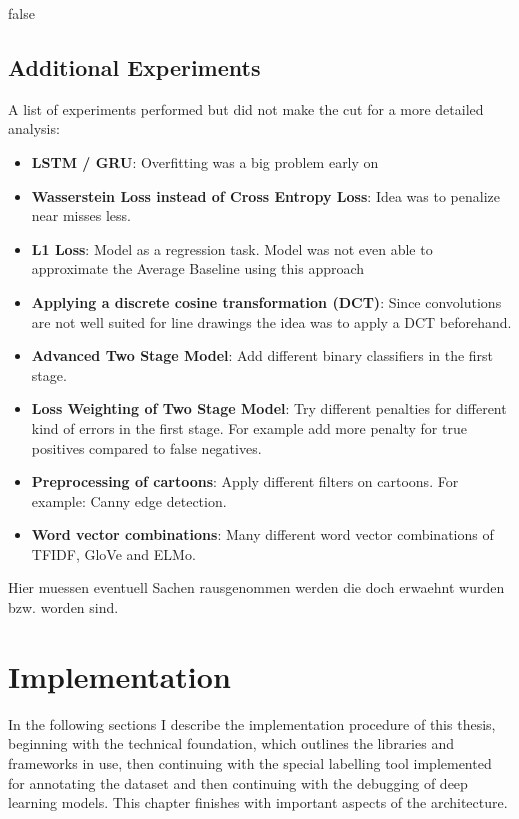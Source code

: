 \documentclass[draft,final,oneside]{vutinfth} %
\begin{document}
\fi

\if false
\section{Additional Experiments}
A list of experiments performed but did not make the cut for a more detailed analysis:

\begin{itemize}
\item \textbf{LSTM / GRU}: Overfitting was a big problem early on
\item \textbf{Wasserstein Loss instead of Cross Entropy Loss}: Idea was to penalize near misses less.
\item \textbf{L1 Loss}: Model as a regression task. Model was not even able to approximate the Average Baseline using this approach
\item \textbf{Applying a discrete cosine transformation (DCT)}: Since convolutions are not well suited for line drawings the idea was to apply a DCT beforehand. 
\item \textbf{Advanced Two Stage Model}: Add different binary classifiers in the first stage.
\item \textbf{Loss Weighting of Two Stage Model}: Try different penalties for different kind of errors in the first stage. For example add more penalty for true positives compared to false negatives.
\item \textbf{Preprocessing of cartoons}: Apply different filters on cartoons. For example: Canny edge detection.
\item \textbf{Word vector combinations}: Many different word vector combinations of TFIDF, GloVe and ELMo. 
\end{itemize}

Hier muessen eventuell Sachen rausgenommen werden die doch erwaehnt wurden bzw. worden sind.
\fi

\chapter{Implementation} \label{implementationchapter}

In the following sections I describe the implementation procedure of this thesis, beginning with the technical foundation, which outlines the libraries and frameworks in use, then continuing with the special labelling tool implemented for annotating the dataset and then continuing with the debugging of deep learning models. This chapter finishes with important aspects of the architecture.
\end{document}
